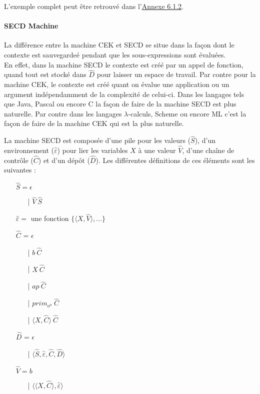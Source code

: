 \documentclass[10pt,a4paper]{report}
\begin{document}
L'exemple complet peut être retrouvé dans l'\hyperref[CEK]{Annexe 6.1.2}.
\bigbreak


\paragraph{SECD Machine}

La différence entre la machine CEK et SECD se situe dans la façon dont le contexte est sauvegardeé pendant que les sous-expressions sont évaluées.\\
En effet, dans la machine SECD le contexte est créé par un appel de fonction, quand tout est stocké dans $\widehat{D}$ pour laisser un espace de travail. Par contre pour la machine CEK, le contexte est créé quant on évalue une application ou un argument indépendamment de la complexité de celui-ci.
\smallbreak 
Dans les langages tels que Java, Pascal ou encore C la façon de faire de la machine SECD est plus naturelle. Par contre  dans les langages $\lambda$-calculs, Scheme ou encore ML c'est la façon de faire de la machine CEK qui est la plus naturelle.
\medbreak

La machine SECD est composée d'une pile pour les valeurs ($\widehat{S}$), d'un environnement ($\widehat{\varepsilon}$) pour lier les variables $X$ à une valeur $\widehat{V}$, d'une chaîne de contrôle ($\widehat{C}$) et d'un dépôt ($\widehat{D}$). Les différentes définitions de ces éléments sont les suivantes :
\smallbreak
\begin{itemize}
\item[] $\widehat{S} = \epsilon$ 
  \begin{itemize}
  \item[|] $\widehat{V}~\widehat{S}$
  \end{itemize}
\item[] $\widehat{\varepsilon} =$ une fonction $\{\langle X,\widehat{V}\rangle,...\}$
\item[] $\widehat{C}$ = $\epsilon$ 
  \begin{itemize}
  \item[|] $b~\widehat{C}$
  \item[|] $X~\widehat{C}$
  \item[|] $ap~\widehat{C}$
  \item[|] $prim_{o^{n}}~\widehat{C}$
  \item[|] $\langle X,\widehat{C}\rangle~\widehat{C}$
  \end{itemize}
\item[] $\widehat{D}$ = $\epsilon$
  \begin{itemize}
  \item[|] $\langle\widehat{S},\widehat{\varepsilon},\widehat{C},\widehat{D}\rangle$
  \end{itemize}
\item[] $\widehat{V} = b$
  \begin{itemize}
  \item[|] $\langle\langle X,\widehat{C}\rangle,\widehat{\varepsilon}\rangle$
  \end{itemize}
\end{itemize}
\bigbreak
\end{document}
